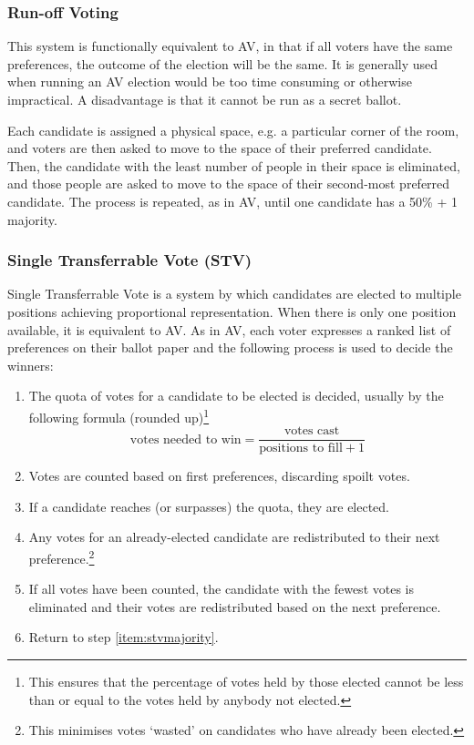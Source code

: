 \documentclass[a4paper, 11pt]{article} %
\begin{document}
\subsubsection{Run-off Voting}
This system is functionally equivalent to AV, in that if all voters have the same preferences, the outcome of the election will be the same.  It is generally used when running an AV election would be too time consuming or otherwise impractical.  A disadvantage is that it cannot be run as a secret ballot.

Each candidate is assigned a physical space, e.g. a particular corner of the room, and voters are then asked to move to the space of their preferred candidate.  Then, the candidate with the least number of people in their space is eliminated, and those people are asked to move to the space of their second-most preferred candidate.  The process is repeated, as in AV, until one candidate has a 50\% + 1 majority.

\subsubsection{Single Transferrable Vote (STV)}
Single Transferrable Vote is a system by which candidates are elected to multiple positions achieving proportional representation.  When there is only one position available, it is equivalent to AV.  As in AV, each voter expresses a ranked list of preferences on their ballot paper and the following process is used to decide the winners:

\begin{enumerate}
\item The quota of votes for a candidate to be elected is decided, usually by the following formula (rounded up)\footnote{This ensures that the percentage of votes held by those elected cannot be less than or equal to the votes held by anybody not elected.} \[\mbox{votes needed to win} = \frac{\mbox{votes cast}}{\mbox{positions to fill}+ 1} \]
\item Votes are counted based on first preferences, discarding spoilt votes.
\item \label{item:stvmajority} If a candidate reaches (or surpasses) the quota, they are elected.
\item Any votes for an already-elected candidate are redistributed to their next preference.\footnote{This minimises votes `wasted' on candidates who have already been elected.}
\item If all votes have been counted, the candidate with the fewest votes is eliminated and their votes are redistributed based on the next preference.
\item Return to step \ref{item:stvmajority}.
\end{enumerate}
\end{document}
